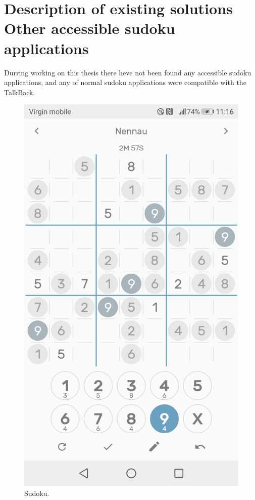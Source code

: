 \documentclass[a4paper,twoside,12pt]{book}
\begin{document}
\section {Description of existing solutions\\{\large Other accessible sudoku applications}}

\par
Durring working on this thesis there heve not been found any accessible sudoku applications, and any of normal sudoku applications were compatible with the TalkBack.
\begin{figure}
\centering
  \includegraphics[width=\linewidth/2]{sudoku.jpg}
  \caption{Sudoku.}
  \label{fig:Sudoku1}
\end{figure}
\end{document}
